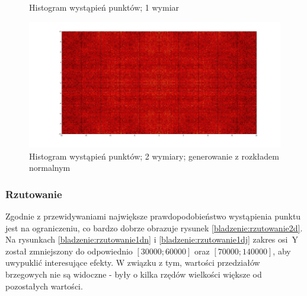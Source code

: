 \documentclass{mini}
\begin{document}
\begin{figure}[H]
\centering
{}
\quad
{}
\caption{Histogram wystąpień punktów; 1 wymiar}
\end{figure}

\begin{figure}[H]
\centering
\includegraphics[width=\textwidth]{c_n_10M_2__20_20__10_10_4}
\caption{Histogram wystąpień punktów; 2 wymiary; generowanie z rozkładem normalnym}
\end{figure}

\subsubsection*{Rzutowanie}
Zgodnie z przewidywaniami największe prawdopodobieństwo wystąpienia punktu jest na ograniczeniu, co bardzo dobrze obrazuje rysunek \ref{bladzenie:rzutowanie2d}. Na rysunkach \ref{bladzenie:rzutowanie1dn} i \ref{bladzenie:rzutowanie1dj} zakres osi~Y został zmniejszony do odpowiednio $[30000;60000]$ oraz $[70000;140000]$, aby uwypuklić interesujące efekty. W związku z tym, wartości przedziałów brzegowych nie są widoczne - były o kilka rzędów wielkości większe od pozostałych wartości.
\end{document}
